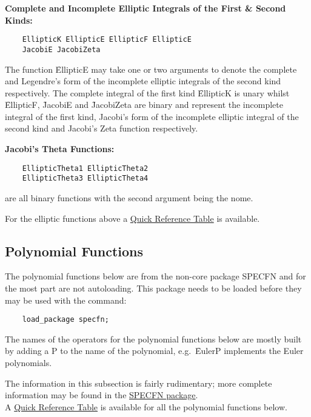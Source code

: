 \textbf{Complete and Incomplete Elliptic Integrals of the First \& Second Kinds:}
\begin{verbatim}
    EllipticK EllipticE EllipticF EllipticE
    JacobiE JacobiZeta
\end{verbatim}
The function \f{EllipticE} may take one or two arguments to
denote the complete and Legendre's form of the incomplete elliptic integrals of
the second kind respectively. The complete integral of the first kind
\f{EllipticK} is unary whilst \f{EllipticF}, \f{JacobiE} and
\f{JacobiZeta} are binary and represent the incomplete integral of
the first kind, Jacobi's form of the incomplete elliptic integral of
the second kind and Jacobi's Zeta function respectively.

\textbf{Jacobi's Theta Functions:}
\begin{verbatim}
    EllipticTheta1 EllipticTheta2
    EllipticTheta3 EllipticTheta4
\end{verbatim}
are all binary functions with the second argument being the nome.

For the elliptic functions above
a \hyperlink{SPECFNTAB3}{Quick Reference Table} is available.

\subsection{Polynomial Functions}
The polynomial functions below are from the non-core package SPECFN
and for the most part are not autoloading. This package needs to be loaded
before they may be used with the command:
\begin{verbatim}
    load_package specfn;
\end{verbatim}
The names of the {\REDUCE} operators for the polynomial functions below
are mostly built by adding a P to the name of the polynomial,
e.g.\ \f{EulerP} implements the Euler polynomials.

The information in this subsection is fairly rudimentary; more complete
information may be found in the \hyperlink{POLYFN}{SPECFN package}.\\
A \hyperlink{SPECFNTAB4}{Quick Reference Table} is available for all the
polynomial functions below.

